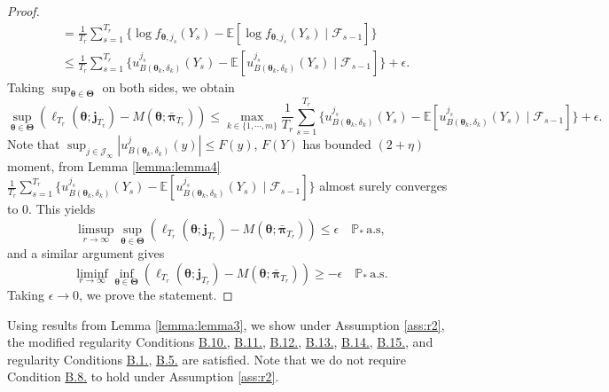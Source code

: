 \documentclass[12pt]{article}
\newcommand{\bfTheta}{\boldsymbol{\Theta}}
\newcommand{\bfpi}{\boldsymbol{\pi}}
\newcommand{\bftheta}{\boldsymbol{\theta}}
\begin{document}
\begin{proof}
\begin{align*}
&= \frac{1}{T_r} \sum_{s=1}^{T_r} \Big\{ 
\log f_{\bftheta, j_s}(Y_s) - \mathbb{E}[ \log f_{\bftheta, j_s}(Y_s) \mid \mathcal{F}_{s-1}] \Big\}
\\ &\le \frac{1}{T_r} \sum_{s=1}^{T_r} \Big\{ u_{B(\bftheta_k, \delta_k)}^{j_s}(Y_s) - \mathbb{E}[ u_{B(\bftheta_k, \delta_k)}^{j_s}(Y_s) \mid \mathcal{F}_{s-1}]  \Big\} + \epsilon.
\end{align*}
Taking $\sup_{\bftheta \in \bfTheta}$ on both sides, we obtain
\begin{equation*}
\sup_{\bftheta \in \bfTheta}( \ell_{T_r}(\bftheta; \mathbf{j}_{T_r}) - M(\bftheta; \bar{\bfpi}_{T_r}) ) 
\leq \max_{k \in \{1, \cdots, m\}} \frac{1}{T_r} \sum_{s=1}^{T_r} \Big\{ u_{B(\bftheta_k, \delta_k)}^{j_s}(Y_s) - \mathbb{E}[ u_{B(\bftheta_k, \delta_k)}^{j_s}(Y_s) \mid \mathcal{F}_{s-1}]  \Big\} + \epsilon.
\end{equation*}
Note that $\sup_{j \in \mathcal{J}_{\infty}} | u_{B(\bftheta_k, \delta_k)}^{j}(y)| \leq F(y)$, $F(Y)$ has bounded $(2 + \eta)$ moment, from Lemma \ref{lemma:lemma4} $\frac{1}{T_r} \sum_{s=1}^{T_r} \Big\{ u_{B(\bftheta_k, \delta_k)}^{j_s}(Y_s) - \mathbb{E}[ u_{B(\bftheta_k, \delta_k)}^{j_s}(Y_s) \mid \mathcal{F}_{s-1}]  \Big\}$ almost surely converges to $0$. This yields 
\begin{equation*}
\limsup_{r \to \infty} \sup_{\bftheta \in \bfTheta}( \ell_{T_r}(\bftheta; \mathbf{j}_{T_r}) - M(\bftheta; \bar{\bfpi}_{T_r}) ) \leq \epsilon \quad \mathbb{P}_{\ast} \, \text{a.s},
\end{equation*}
and a similar argument gives 
\begin{equation*}
\liminf_{r \to \infty} \inf_{\bftheta \in \bfTheta}( \ell_{T_r}(\bftheta; \mathbf{j}_{T_r}) - M(\bftheta; \bar{\bfpi}_{T_r}) ) \geq -\epsilon \quad \mathbb{P}_{\ast} \, \text{a.s}.
\end{equation*}
Taking $\epsilon \to 0$, we prove the statement.
\end{proof}



Using results from Lemma \ref{lemma:lemma3}, we show under Assumption \ref{ass:r2}, the modified regularity Conditions  \hyperref[c:c2']{B.10.},
\hyperref[c:c3']{B.11.}, \hyperref[c:c4']{B.12.}, \hyperref[c:c6a']{B.13.}, \hyperref[c:c7a']{B.14.}, \hyperref[c:c7b']{B.15.}, and regularity Conditions \hyperref[c:c1]{B.1.}, \hyperref[c:c5]{B.5.} are satisfied. Note that we do not require Condition \hyperref[c:c6b]{B.8.} to hold under Assumption \ref{ass:r2}.
\end{document}
